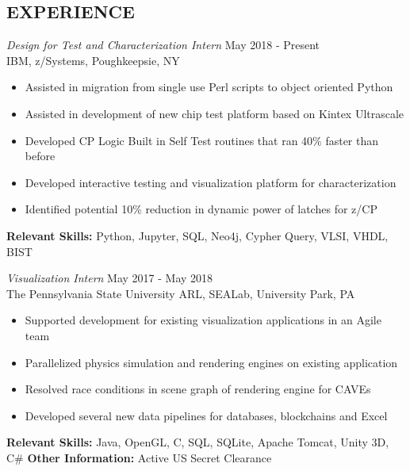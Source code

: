 \documentclass[line,margin]{res}
\begin{document}
\begin{resume}
		\section{EXPERIENCE}{\sl Design for Test and Characterization Intern} \hfill May 2018 - Present\\
		IBM, z/Systems, Poughkeepsie, NY
		\begin{itemize}  \itemsep -2pt
			\item Assisted in migration from single use Perl scripts to object oriented Python
			\item Assisted in development of new chip test platform based on Kintex Ultrascale
			\item Developed CP Logic Built in Self Test routines that ran 40\% faster than before
			\item Developed interactive testing and visualization platform for characterization
			\item Identified potential 10\% reduction in dynamic power of latches for z/CP
			\vspace*{-\baselineskip}		
		\end{itemize}
		\textbf{Relevant Skills:} Python, Jupyter, SQL, Neo4j, Cypher Query, VLSI, VHDL, BIST
		
		{\sl Visualization Intern} \hfill May 2017 - May 2018 \\
		The Pennsylvania State University ARL, SEALab, University Park, PA
		\begin{itemize}  \itemsep -2pt
			\item Supported development for existing visualization applications in an Agile team
			\item Parallelized physics simulation and rendering engines on existing application
			\item Resolved race conditions in scene graph of rendering engine for CAVEs
			\item Developed several new data pipelines for databases, blockchains and Excel
			\vspace*{-\baselineskip}		
		\end{itemize}
		\textbf{Relevant Skills:} Java, OpenGL, C, SQL, SQLite, Apache Tomcat, Unity 3D, C\#
		\textbf{Other Information:} Active US Secret Clearance
		

\end{resume}
\end{document}
